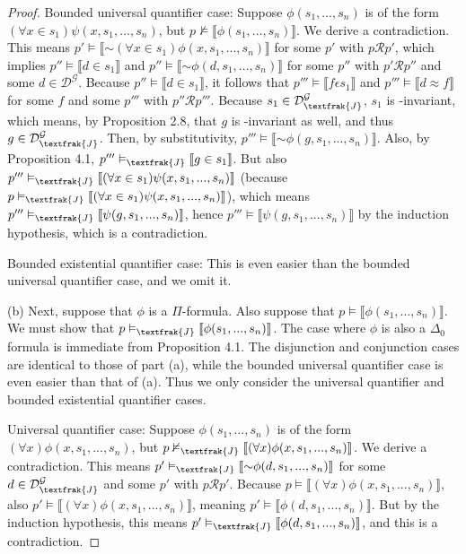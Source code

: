 \documentclass{article}
\newcommand*{\oldneg}{\mathord{\sim}}
\newcommand{\lbc}{\llbracket}
\newcommand{\rbc}{\rrbracket}
\theoremstyle{definition}
\begin{document}
\begin{proof}
Bounded universal quantifier case: Suppose $\phi(s_1,...,s_n)$ is of the form
$(\forall x\in s_1)\psi(x,s_1,...,s_n)$, but $p\nvDash\lbc\phi(s_1,...,s_n)\rbc$. We derive a contradiction.
This means $p'\vDash\lbc\oldneg(\forall x\in s_1)\phi(x,s_1,...,s_n)\rbc$ for some $p'$ with $p\mathcal{R}p'$, which 
implies $p''\vDash\lbc d\in s_1\rbc$ and $p''\vDash\lbc\oldneg\phi(d,s_1,...,s_n)\rbc$ for some 
$p''$ with $p'\mathcal{R}p''$ and some $d\in\mathcal{D}^\mathcal{G}$. Because 
$p''\vDash\lbc d\in s_1\rbc$, it follows that $p'''\vDash\lbc f\epsilon s_1\rbc$ and 
$p'''\vDash\lbc d\approx f\rbc$ for some $f$ and some $p'''$ with $p''\mathcal{R}p'''$. 
Because $s_1\in\mathcal{D}^\mathcal{G}_\textfrak{J}$, 
$s_1$ is -invariant, which means, by Proposition 2.8, that $g$ is -invariant as well, and thus 
$g\in\mathcal{D}^\mathcal{G}_\textfrak{J}$. Then, by substitutivity, 
$p'''\vDash\lbc\oldneg\phi(g,s_1,...,s_n)\rbc$. Also, by Proposition 4.1, 
$p'''\vDash_\textfrak{J}\lbc g\in s_1\rbc$. But also 
$p'''\vDash_\textfrak{J}\lbc(\forall x\in s_1)\psi(x,s_1,...,s_n)\rbc$ (because 
$p\vDash_\textfrak{J}\lbc(\forall x\in s_1)\psi(x,s_1,...,s_n)\rbc$), which means
$p'''\vDash_\textfrak{J}\lbc\psi(g,s_1,...,s_n)\rbc$, hence
$p'''\vDash\lbc\psi(g,s_1,...,s_n)\rbc$ by the induction hypothesis, which is a contradiction.

Bounded existential quantifier case: This is even easier than the bounded universal quantifier case, and we omit it.

(b) Next, suppose that $\phi$ is a $\Pi$-formula. Also suppose that $p\vDash\lbc\phi(s_1,...,s_n)\rbc$. We 
must show that $p\vDash_\textfrak{J}\lbc\phi(s_1,...,s_n)\rbc$. The case where $\phi$ is also a $\Delta_0$ formula
is immediate from Proposition 4.1. The disjunction and conjunction cases are identical to those of part (a), 
while the bounded universal quantifier case is even easier than that of (a). Thus we only consider the 
universal quantifier and bounded existential quantifier cases.

Universal quantifier case: Suppose $\phi(s_1,...,s_n)$ is of the form
$(\forall x)\phi(x,s_1,...,s_n)$, but $p\nvDash_\textfrak{J}\lbc(\forall x)\phi(x,s_1,...,s_n)\rbc$. We derive a contradiction.
This means $p'\vDash_\textfrak{J}\lbc\oldneg\phi(d,s_1,...,s_n)\rbc$ for some $d\in\mathcal{D}^\mathcal{G}_\textfrak{J}$ and 
some $p'$ with $p\mathcal{R}p'$. Because $p\vDash\lbc(\forall x)\phi(x,s_1,...,s_n)\rbc$,
also $p'\vDash\lbc(\forall x)\phi(x,s_1,...,s_n)\rbc$, meaning
$p'\vDash\lbc\phi(d,s_1,...,s_n)\rbc$. But by the induction hypothesis, this means
$p'\vDash_\textfrak{J}\lbc\phi(d,s_1,...,s_n)\rbc$, and this is a contradiction.


\end{proof}
\end{document}
